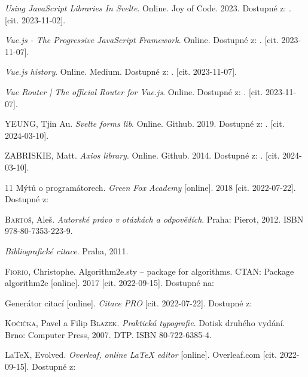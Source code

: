 \begin{thebibliography}{99}
\emph{Using JavaScript Libraries In Svelte}. Online. Joy of Code. 2023. Dostupné z: . [cit. 2023-11-02].

\emph{Vue.js - The Progressive JavaScript Framework}. Online. Dostupné z: . [cit. 2023-11-07].

\emph{Vue.js history}. Online. Medium. Dostupné z: . [cit. 2023-11-07].

\emph{Vue Router | The official Router for Vue.js}. Online. Dostupné z: . [cit. 2023-11-07].

\textsc{YEUNG}, Tjin Au. \emph{Svelte forms lib}. Online. Github. 2019. Dostupné z: . [cit. 2024-03-10].

\textsc{ZABRISKIE}, Matt. \emph{Axios library}. Online. Github. 2014. Dostupné z: . [cit. 2024-03-10].



11 Mýtů o programátorech. \emph{Green Fox Academy} [online]. 2018 [cit. 2022-07-22]. Dostupné z: 

\textsc{Bartoš}, Aleš. \emph{Autorské právo v otázkách a odpovědích}. Praha: Pierot, 2012. ISBN 978-80-7353-223-9.

\emph{Bibliografické citace}. Praha, 2011.

\textsc{Fiorio}, Christophe. Algorithm2e.sty -- package for algorithms. CTAN: Package algorithm2e [online]. 2017 [cit. 2022-09-15]. Dostupné na: 

Generátor citací [online]. \emph{Citace PRO} [cit. 2022-07-22]. Dostupné z: 

\textsc{Kočička}, Pavel a Filip \textsc{Blažek}. \emph{Praktická typografie}. Dotisk druhého vydání. Brno: Computer Press, 2007. DTP. ISBN 80-722-6385-4.


\LaTeX, Evolved. \emph{Overleaf, online \LaTeX{} editor} [online]. Overleaf.com [cit. 2022-09-15]. Dostupné z: 



\end{thebibliography}
